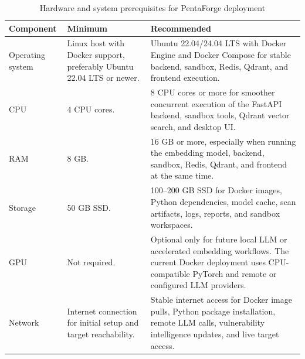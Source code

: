 \begin{table}[H]
    \centering
    \caption{Hardware and system prerequisites for PentaForge deployment}
    \label{tab:hardware_prerequisites}
    \renewcommand{\arraystretch}{1.35}
    \begin{tabular}{|p{}|p{}|p{}|}
        \hline
        \textbf{Component} & \textbf{Minimum} & \textbf{Recommended} \\
        \hline
        Operating system & Linux host with Docker support, preferably Ubuntu 22.04
        LTS or newer. & Ubuntu 22.04/24.04 LTS with Docker Engine and Docker Compose
        for stable backend, sandbox, Redis, Qdrant, and frontend execution. \\
        \hline
        CPU & 4 CPU cores. & 8 CPU cores or more for smoother concurrent execution
        of the FastAPI backend, sandbox tools, Qdrant vector search, and desktop UI. \\
        \hline
        RAM & 8 GB. & 16 GB or more, especially when running the embedding model,
        backend, sandbox, Redis, Qdrant, and frontend at the same time. \\
        \hline
        Storage & 50 GB SSD. & 100--200 GB SSD for Docker images, Python
        dependencies, model cache, scan artifacts, logs, reports, and sandbox
        workspaces. \\
        \hline
        GPU & Not required. & Optional only for future local LLM or accelerated
        embedding workflows. The current Docker deployment uses CPU-compatible
        PyTorch and remote or configured LLM providers. \\
        \hline
        Network & Internet connection for initial setup and target reachability. &
        Stable internet access for Docker image pulls, Python package installation,
        remote LLM calls, vulnerability intelligence updates, and live target access. \\
        \hline
    \end{tabular}
\end{table}

